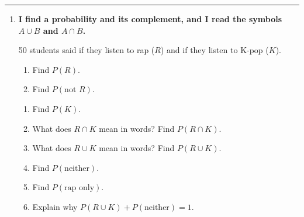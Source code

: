 \documentclass[11pt]{article}
\newcommand{\lessonhead}[1]{\par\vspace{0.6em}{\large\bfseries #1}\par\vspace{0.25em}\hrule\vspace{0.6em}}
\newcommand{\goal}[1]{\textbf{#1}\par\vspace{0.35em}}
\begin{document}
\partner

\newpage
\lessonhead{6.1 - Venn Diagrams and the Addition Rule}
\begin{enumerate}

\item \goal{I find a probability and its complement, and I read the symbols $A \cup B$ and $A \cap B$.}
50 students said if they listen to rap ($R$) and if they listen to K-pop ($K$).

\begin{minipage}[t]{0.45\linewidth}\vspace{0pt}\raggedright
{}
\end{minipage}\hfill
\begin{minipage}[t]{0.52\linewidth}\vspace{0pt}\raggedright
\begin{enumerate}
  \item Find $P(R)$.

  \work{2.5em}
  \item Find $P(\text{not } R)$.

  \work{2.5em}
\end{enumerate}
\end{minipage}

\vspace{0.6em}
\begin{enumerate}[start=3]
  \item Find $P(K)$. 
  \work{2.5em}
  \item What does $R \cap K$ mean in words? Find $P(R \cap K)$.

  \work{3em}
  \item What does $R \cup K$ mean in words? Find $P(R \cup K)$.

  \work{3em}
  \item Find $P(\text{neither})$. 
  \work{2.5em}
  \item Find $P(\text{rap only})$. 
  \work{2.5em}
  \item Explain why $P(R \cup K) + P(\text{neither}) = 1$.


\end{enumerate}
\end{enumerate}
\end{document}
